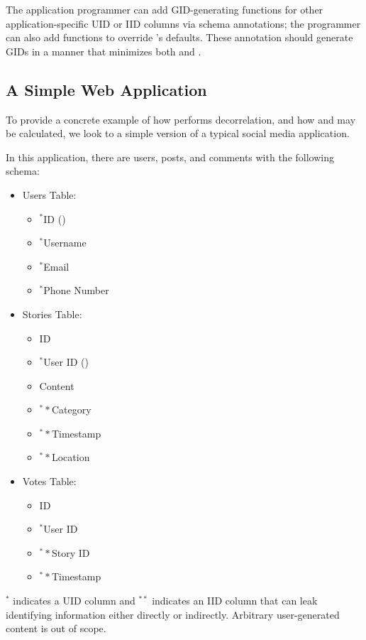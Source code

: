 The application programmer can add GID-generating functions for other application-specific UID or
IID columns via schema annotations; the programmer can also add functions to override \sys's
defaults.  These annotation should generate GIDs in a manner that minimizes both \premnant{} and
\plinked{}.


\subsection{A Simple Web Application}
To provide a concrete example of how \sys{} performs decorrelation, and how \plinked{} and
\premnant{} may be calculated, we look to a simple version of a typical social media 
application.

In this application, there are users, posts, and comments with the following schema:
\begin{itemize}
    \item Users Table:
\begin{itemize}
    \item $^*$ID (\uidkey{})
    \item $^*$Username
    \item $^*$Email 
    \item $^*$Phone Number 
\end{itemize}
    \item Stories Table:
\begin{itemize}
    \item ID 
    \item $^*$User ID (\uidkey{})
    \item Content 
    \item $^**$Category 
    \item $^**$Timestamp 
    \item $^**$Location 
\end{itemize}
\item Votes Table:
\begin{itemize}
    \item ID 
    \item $^*$User ID 
    \item $^**$Story ID 
    \item $^**$Timestamp 
\end{itemize}
\end{itemize}
$^*$ indicates a UID column and $^{**}$ indicates an IID column that can leak identifying information either directly or indirectly.
Arbitrary user-generated content is out of scope.

